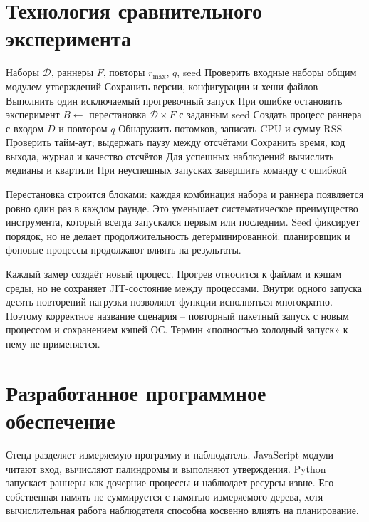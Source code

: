 \section{Технология сравнительного эксперимента}
\begin{algorithm}[H]
\small{}
\caption{Воспроизводимое сравнение тестовых раннеров}
\begin{algorithmic}[1]
\Require Наборы $\mathcal D$, раннеры $F$, повторы $r_{\max}$, $q$, seed
\State Проверить входные наборы общим модулем утверждений
\State Сохранить версии, конфигурации и хеши файлов
  \State Выполнить один исключаемый прогревочный запуск
  \State При ошибке остановить эксперимент
\EndFor
{}
  \State $B\gets$ перестановка $\mathcal D\times F$ с заданным seed
    \State Создать процесс раннера с входом $D$ и повтором $q$
      \State Обнаружить потомков, записать CPU и сумму RSS
      \State Проверить тайм-аут; выдержать паузу между отсчётами
    \EndWhile
    \State Сохранить время, код выхода, журнал и качество отсчётов
  \EndFor
\EndFor
\State Для успешных наблюдений вычислить медианы и квартили
\State При неуспешных запусках завершить команду с ошибкой
\end{algorithmic}
\end{algorithm}

Перестановка строится блоками: каждая комбинация набора и раннера появляется ровно один раз в каждом раунде. Это уменьшает систематическое преимущество инструмента, который всегда запускался первым или последним. Seed фиксирует порядок, но не делает продолжительность детерминированной: планировщик и фоновые процессы продолжают влиять на результаты.

Каждый замер создаёт новый процесс. Прогрев относится к файлам и кэшам среды, но не сохраняет JIT-состояние между процессами. Внутри одного запуска десять повторений нагрузки позволяют функции исполняться многократно. Поэтому корректное название сценария -- повторный пакетный запуск с новым процессом и сохранением кэшей ОС. Термин «полностью холодный запуск» к нему не применяется.

\section{Разработанное программное обеспечение}
Стенд разделяет измеряемую программу и наблюдатель. JavaScript-модули читают вход, вычисляют палиндромы и выполняют утверждения. Python запускает раннеры как дочерние процессы и наблюдает ресурсы извне. Его собственная память не суммируется с памятью измеряемого дерева, хотя вычислительная работа наблюдателя способна косвенно влиять на планирование.

